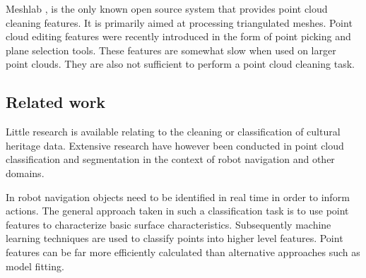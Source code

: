 \documentclass[10pt,twocolumn]{article}
\begin{document}
Meshlab \cite{VisualComputingLaboratory2012}, is the only known open source system that provides point cloud cleaning features. It is primarily aimed at processing triangulated meshes. Point cloud editing features were recently introduced in the form of point picking and plane selection tools. These features are somewhat slow when used on larger point clouds. They are also not sufficient to perform a point cloud cleaning task.







\subsection{Related work}



Little research is available relating to the cleaning or classification of cultural heritage data. Extensive research have however been conducted in point cloud classification and segmentation in the context of robot navigation and other domains.

In robot navigation objects need to be identified in real time in order to inform actions. The general approach taken in such a classification task is to use point features to characterize basic surface characteristics. Subsequently machine learning techniques are used to classify points into higher level features. Point features can be far more efficiently calculated than alternative approaches such as model fitting.
\end{document}
